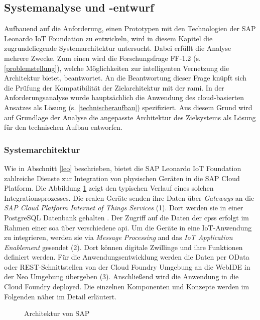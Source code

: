 \subsection{Systemanalyse und -entwurf}

Aufbauend auf die Anforderung, einen Prototypen mit den Technologien der SAP Leonardo IoT Foundation zu entwickeln, wird in diesem Kapitel die zugrundeliegende Systemarchitektur untersucht. Dabei erfüllt die Analyse mehrere Zwecke. Zum einen wird die Forschungsfrage FF-1.2 (s. \ref{problemstellung}), welche Möglichkeiten zur intelligenten Vernetzung die Architektur bietet, beantwortet. An die Beantwortung dieser Frage knüpft sich die Prüfung der Kompatibilität der Zielarchitektur mit der \ac{rami}. In der Anforderungsanalyse wurde hauptsächlich die Anwendung des cloud-basierten Ansatzes als Lösung (s. \ref{technischeraufbau}) spezifiziert. Aus diesem Grund wird auf Grundlage der Analyse die angepasste Architektur des Zielsystems als Lösung für den technischen Aufbau entworfen.

\subsubsection{Systemarchitektur}

Wie in Abschnitt \ref{leo} beschrieben, bietet die SAP Leonardo IoT Foundation zahlreiche Dienste zur Integration von physischen Geräten in die SAP Cloud Platform. Die Abbildung \ref{saparch} zeigt den typischen Verlauf eines solchen Integrationsprozesses. Die realen Geräte senden ihre Daten über \textit{Gateways} an die \textit{SAP Cloud Platform Internet of Things Services} (1). Dort werden sie in einer PostgreSQL Datenbank gehalten \citep{Acharya2019}. Der Zugriff auf die Daten der \ac{cpss} erfolgt im Rahmen einer \acf{soa} über verschiedene \ac{api}. Um die Geräte in eine IoT-Anwendung zu integrieren, werden sie via \textit{Message Processing} and das \textit{IoT Application Enablement} gesendet (2). Dort können digitale Zwillinge und ihre Funktionen definiert werden. Für die Anwendungsentwicklung werden die Daten per OData oder REST-Schnittstellen von der Cloud Foundry Umgebung an die WebIDE in der Neo Umgebung übergeben (3). Anschließend wird die Anwendung in die Cloud Foundry deployed. Die einzelnen Komponenten und Konzepte werden im Folgenden näher im Detail erläutert.



\begin{figure}[ht!]
  \centering
  \noindent{}
  \caption[Architektur von SAP]{Architektur von SAP \citep{Ganz2019}}
  \label{saparch}
\end{figure}

